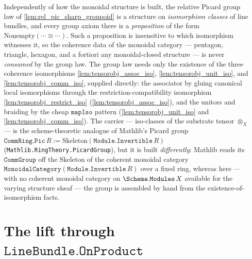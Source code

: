 \begin{remark}
  Independently of how the monoidal structure is built, the relative Picard
  group law of \cref{lem:rel_pic_sharp_groupoid} is a structure on
  \emph{isomorphism classes} of line bundles, and every group axiom there is a
  \emph{proposition} of the form \(\mathrm{Nonempty}(\cdots \cong \cdots)\).
  Such a proposition is insensitive to which isomorphism witnesses it, so the
  coherence data of the monoidal category --- pentagon, triangle, hexagon, and
  a fortiori any monoidal-closed structure --- is never \emph{consumed} by the
  group law. The group law needs only the existence of the three coherence
  isomorphisms \cref{lem:tensorobj_assoc_iso}, \cref{lem:tensorobj_unit_iso}, and
  \cref{lem:tensorobj_comm_iso}, supplied directly: the associator by gluing canonical
  local isomorphisms through the restriction-compatibility isomorphism
  \cref{lem:tensorobj_restrict_iso} (\cref{lem:tensorobj_assoc_iso}), and the
  unitors and braiding by the cheap \(\mathtt{mapIso}\) pattern
  (\cref{lem:tensorobj_unit_iso} and \cref{lem:tensorobj_comm_iso}). The carrier --- iso-classes
  of the substrate tensor \(\otimes_X\) --- is the scheme-theoretic analogue of
  Mathlib's Picard group \(\mathtt{CommRing.Pic}\,R := \mathrm{Skeleton}(
  \mathtt{Module.Invertible}\,R)\) (\texttt{Mathlib.RingTheory.PicardGroup}), but it
  is built \emph{differently}: Mathlib reads its \(\mathtt{CommGroup}\) off the
  \(\mathrm{Skeleton}\) of the coherent monoidal category
  \(\mathtt{MonoidalCategory}(\mathtt{Module.Invertible}\,R)\) over a fixed ring,
  whereas here --- with no coherent monoidal category on
  \(\Scheme.\mathtt{Modules}\,X\) available for the varying structure sheaf --- the
  group is assembled by hand from the existence-of-isomorphism facts.
\end{remark}

\section{The lift through \(\texttt{LineBundle.OnProduct}\)}
\label{sec:tensorobj_onproduct_lift}

